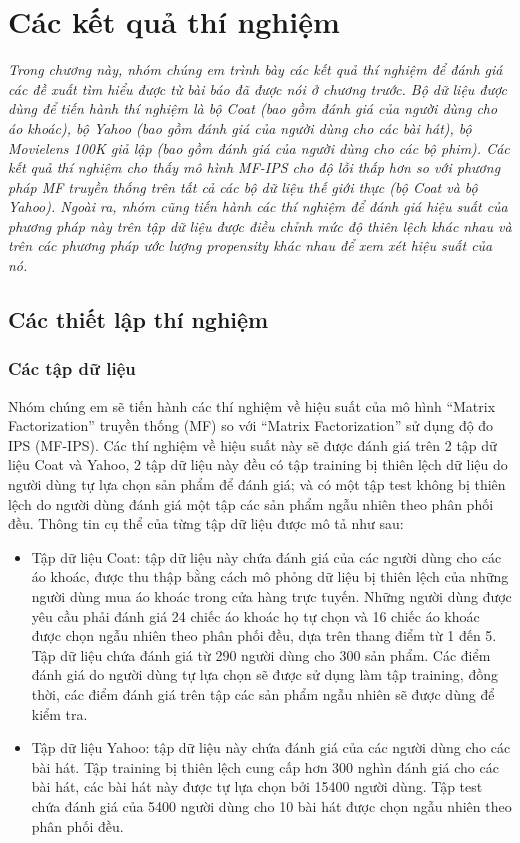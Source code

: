 \chapter{Các kết quả thí nghiệm}
\label{Chapter4}

\noindent\textit{Trong chương này, nhóm chúng em trình bày các kết quả thí nghiệm để đánh giá các đề xuất tìm hiểu được từ bài báo đã được nói ở chương trước. Bộ dữ liệu được dùng để tiến hành thí nghiệm là bộ Coat (bao gồm đánh giá của người dùng cho áo khoác), bộ Yahoo (bao gồm đánh giá của người dùng cho các bài hát), bộ Movielens 100K giả lập (bao gồm đánh giá của người dùng cho các bộ phim). Các kết quả thí nghiệm cho thấy mô hình MF-IPS cho độ lỗi thấp hơn so với phương pháp MF truyền thống trên tất cả các bộ dữ liệu thế giới thực (bộ Coat và bộ Yahoo). Ngoài ra, nhóm cũng tiến hành các thí nghiệm để đánh giá hiệu suất của phương pháp này trên tập dữ liệu được điều chỉnh mức độ thiên lệch khác nhau và trên các phương pháp ước lượng propensity khác nhau để xem xét hiệu suất của nó.}

\section{Các thiết lập thí nghiệm}
\label{sec:4_setup}
\subsection{Các tập dữ liệu}
Nhóm chúng em sẽ tiến hành các thí nghiệm về hiệu suất của mô hình ``Matrix Factorization'' truyền thống (MF) so với ``Matrix Factorization'' sử dụng độ đo IPS (MF-IPS). Các thí nghiệm về hiệu suất này sẽ được đánh giá trên 2 tập dữ liệu Coat và Yahoo, 2 tập dữ liệu này đều có tập training bị thiên lệch dữ liệu do người dùng tự lựa chọn sản phẩm để đánh giá; và có một tập test không bị thiên lệch do người dùng đánh giá một tập các sản phẩm ngẫu nhiên theo phân phối đều. Thông tin cụ thể của từng tập dữ liệu được mô tả như sau:
\begin{itemize}
    \item Tập dữ liệu Coat: tập dữ liệu này chứa đánh giá của các người dùng cho các áo khoác, được thu thập bằng cách mô phỏng dữ liệu bị thiên lệch của những người dùng mua áo khoác trong cửa hàng trực tuyến. Những người dùng được yêu cầu phải đánh giá 24 chiếc áo khoác họ tự chọn và 16 chiếc áo khoác được chọn ngẫu nhiên theo phân phối đều, dựa trên thang điểm từ 1 đến 5. Tập dữ liệu chứa đánh giá từ 290 người dùng cho 300 sản phẩm. Các điểm đánh giá do người dùng tự lựa chọn sẽ được sử dụng làm tập training, đồng thời, các điểm đánh giá trên tập các sản phẩm ngẫu nhiên sẽ được dùng để kiểm tra. 
    \item Tập dữ liệu Yahoo: tập dữ liệu này chứa đánh giá của các người dùng cho các bài hát. Tập training bị thiên lệch cung cấp hơn 300 nghìn đánh giá cho các bài hát, các bài hát này được tự lựa chọn bởi 15400 người dùng. Tập test chứa đánh giá của 5400 người dùng cho 10 bài hát được chọn ngẫu nhiên theo phân phối đều.
\end{itemize}

